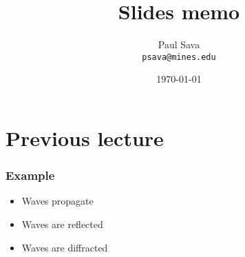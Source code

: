 \title[Remember this]{Slides memo}
\author[]{Paul Sava \\ \texttt{psava@mines.edu}}
\date{\today}
\logo{}

 { \pcscover }
 { \pcsoutline }

\section{Previous lecture}

\begin{frame} \frametitle{Example}

 \begin{itemize}
    \item Waves propagate
    \item Waves are reflected
    \item Waves are diffracted
 \end{itemize}

\end{frame}




\begin{frame} \frametitle{}
\end{frame}


\begin{frame} \frametitle{}


\end{frame}




